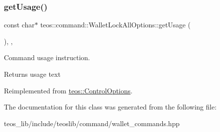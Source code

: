 \subsubsection{\texorpdfstring{get\+Usage()}{getUsage()}}
{\footnotesize\ttfamily const char$\ast$ teos\+::command\+::\+Wallet\+Lock\+All\+Options\+::get\+Usage (\begin{DoxyParamCaption}{ }\end{DoxyParamCaption})\hspace{0.3cm}{\ttfamily [inline]}, {\ttfamily [protected]}, {\ttfamily [virtual]}}



Command \textquotesingle{}usage\textquotesingle{} instruction. 

\begin{DoxyReturn}{Returns}
usage text 
\end{DoxyReturn}


Reimplemented from \mbox{\hyperlink{classteos_1_1_control_options_a0aa5671f9bc750ed5280c26c543874f3}{teos\+::\+Control\+Options}}.



The documentation for this class was generated from the following file\+:\begin{DoxyCompactItemize}
\item 
teos\+\_\+lib/include/teoslib/command/wallet\+\_\+commands.\+hpp\end{DoxyCompactItemize}
